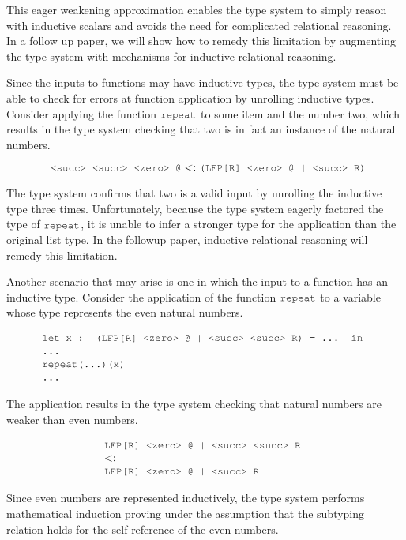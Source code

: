 \documentclass[acmsmall]{acmart}
\theoremstyle{definition}
\begin{document}
This eager weakening approximation enables the type system
to simply reason with inductive scalars and avoids the need for complicated
relational reasoning. In a follow up paper,
we will show how to remedy this limitation by augmenting the type system with
mechanisms for inductive relational reasoning.

Since the inputs to functions may have inductive types, the type 
system must be able to check for errors at function application by unrolling
inductive types.
Consider applying the function $\J{repeat}$ to some item and the number two, 
which results in the type system checking that two is in fact an instance of the natural numbers.

\[
  \J{ <succ> <succ> <zero> @} \subtypes \J{(LFP[R] <zero> @ | <succ> R)}
\]

The type system confirms that two is a valid input by unrolling the inductive type three times.
Unfortunately, because the type system eagerly factored the type of $\J{repeat}$, it
is unable to infer a stronger type for the application than the original list type. 
In the followup paper, inductive relational reasoning will remedy this limitation.


Another scenario that may arise is one in which the input to a function has an inductive type.
Consider the application of the function $\J{repeat}$ to a variable whose type represents the even natural numbers.

\[
  \begin{array}[t]{@{} l}
    \J{let x : (LFP[R] <zero> @ | <succ> <succ> R) = ... in}
    \\
    \J{...}
    \\
    \J{repeat(...)(x)} 
    \\
    \J{...}
  \end{array}
\]

The application results in the type system checking that natural numbers are weaker than even numbers. 

\[
  \begin{array}[t]{@{} l}
    \J{LFP[R] <zero> @ | <succ> <succ> R}
    \\
    \subtypes
    \\
    \J{LFP[R] <zero> @ | <succ> R}
  \end{array}
\]


Since even numbers are represented inductively, the type system performs mathematical induction
proving under the assumption that the subtyping relation holds for the self reference of the even numbers. 
\end{document}
